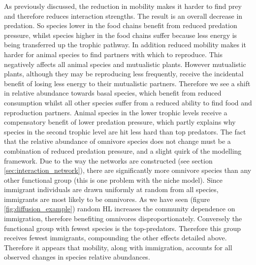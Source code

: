 As previously discussed, the reduction in mobility makes it harder to find prey and therefore reduces interaction strengths. The result is an overall decrease in predation. So species lower in the food chains benefit from reduced predation pressure, whilst species higher in the food chains suffer because less energy is being transferred up the trophic pathway. In addition reduced mobility makes it harder for animal species to find partners with which to reproduce. This negatively affects all animal species and mutualistic plants. However mutualistic plants, although they may be reproducing less frequently, receive the incidental benefit of losing less energy to their mutualistic partners.  Therefore we see a shift in relative abundance towards basal species, which benefit from reduced consumption whilst all other species suffer from a reduced ability to find food and reproduction partners. Animal species in the lower trophic levels receive a compensatory benefit of lower predation pressure, which partly explains why species in the second trophic level are hit less hard than top predators. The fact that the relative abundance of omnivore species does not change must be a combination of reduced predation pressure, and a slight quirk of the modelling framework. Due to the way the networks are constructed (see section \ref{sec:interaction_network}), there are significantly more omnivore species than any other functional group (this is one problem with the niche model). Since immigrant individuals are drawn uniformly at random from all species, immigrants are most likely to be omnivores. As we have seen (figure \ref{fig:diffusion_example}) random HL increases the community dependence on immigration, therefore benefiting omnivores disproportionately. Conversely the functional group with fewest species is the top-predators. Therefore this group receives fewest immigrants, compounding the other effects detailed above. Therefore it appears that mobility, along with immigration, accounts for all observed changes in species relative abundances.  



